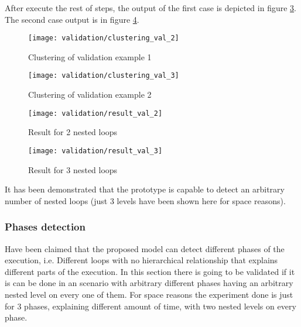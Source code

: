 After execute the rest of steps, the output of the first case is depicted in figure 
\ref{fig:result_val_2}. The second case output is in figure \ref{fig:result_val_3}. 

\begin{multicols}{2}
  \begin{figure}[H]
    \centering
    \texttt{[image: validation/clustering\_val\_2]}
    \caption{Clustering of validation example 1}
    \label{fig:clustering_val_2}
  \end{figure}
  \columnbreak
  \begin{figure}[H]
    \centering
    \texttt{[image: validation/clustering\_val\_3]}
    \caption{Clustering of validation example 2}
    \label{fig:clustering_val_3}
  \end{figure}
\end{multicols}

\begin{figure}[H]
    \centering
    \texttt{[image: validation/result\_val\_2]}
    \caption{Result for 2 nested loops}
    \label{fig:result_val_2}
\end{figure}
\begin{figure}[H]
    \centering
    \texttt{[image: validation/result\_val\_3]}
    \caption{Result for 3 nested loops}
    \label{fig:result_val_3}
\end{figure}

It has been demonstrated that the prototype is capable to detect an arbitrary
number of nested loops (just 3 levels have been shown here for space reasons).

\subsubsection{Phases detection}

Have been claimed that the proposed model can detect different phases of the
execution, i.e. Different loops with no hierarchical relationship that explains
different parts of the execution. In this section there is going to be validated
if it is can be done in an scenario with arbitrary different phases having an
arbitrary nested level on every one of them. For space reasons the experiment
done is just for 3 phases, explaining different amount of time, with two nested 
levels on every phase.

